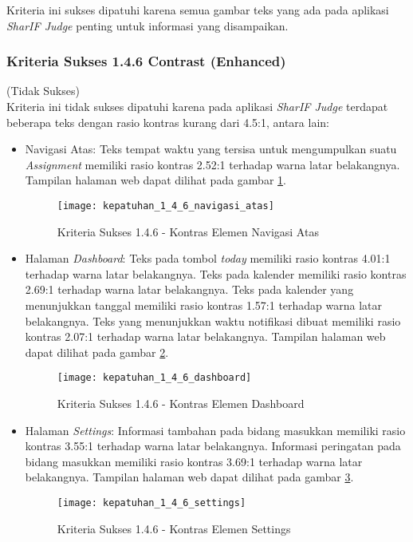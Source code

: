 Kriteria ini sukses dipatuhi karena semua gambar teks yang ada pada aplikasi \textit{SharIF Judge} penting untuk informasi yang disampaikan.

\subsubsection{Kriteria Sukses 1.4.6 Contrast (Enhanced)}
\label{subsubsec:kepatuhan_kriteria_1.4.6}

(Tidak Sukses) \\

Kriteria ini tidak sukses dipatuhi karena pada aplikasi \textit{SharIF Judge} terdapat beberapa teks dengan rasio kontras kurang dari 4.5:1, antara lain:
\begin{itemize}
	\item Navigasi Atas: Teks tempat waktu yang tersisa untuk mengumpulkan suatu \textit{Assignment} memiliki rasio kontras 2.52:1 terhadap warna latar belakangnya. Tampilan halaman web dapat dilihat pada gambar \ref{fig:kepatuhan_1_4_6_navigasi_atas}.
	\begin{figure}[H]
		\centering  
		\texttt{[image: kepatuhan\_1\_4\_6\_navigasi\_atas]}  
		\caption[Kriteria Sukses 1.4.6 - Kontras Elemen Navigasi Atas]{Kriteria Sukses 1.4.6 - Kontras Elemen Navigasi Atas} 
		\label{fig:kepatuhan_1_4_6_navigasi_atas} 
	\end{figure}

	\item Halaman \textit{Dashboard}: Teks pada tombol \textit{today} memiliki rasio kontras 4.01:1 terhadap warna latar belakangnya. Teks pada kalender memiliki rasio kontras 2.69:1 terhadap warna latar belakangnya. Teks pada kalender yang menunjukkan tanggal memiliki rasio kontras 1.57:1 terhadap warna latar belakangnya. Teks yang menunjukkan waktu notifikasi dibuat memiliki rasio kontras 2.07:1 terhadap warna latar belakangnya. Tampilan halaman web dapat dilihat pada gambar \ref{fig:kepatuhan_1_4_6_dashboard}.
	\begin{figure}[H]
		\centering  
		\texttt{[image: kepatuhan\_1\_4\_6\_dashboard]}  
		\caption[Kriteria Sukses 1.4.6 - Kontras Elemen Dashboard]{Kriteria Sukses 1.4.6 - Kontras Elemen Dashboard} 
		\label{fig:kepatuhan_1_4_6_dashboard} 
	\end{figure}

	\item Halaman \textit{Settings}: Informasi tambahan pada bidang masukkan memiliki rasio kontras 3.55:1 terhadap warna latar belakangnya. Informasi peringatan pada bidang masukkan memiliki rasio kontras 3.69:1 terhadap warna latar belakangnya. Tampilan halaman web dapat dilihat pada gambar \ref{fig:kepatuhan_1_4_6_settings}.
	\begin{figure}[H]
		\centering  
		\texttt{[image: kepatuhan\_1\_4\_6\_settings]}  
		\caption[Kriteria Sukses 1.4.6 - Kontras Elemen Settings]{Kriteria Sukses 1.4.6 - Kontras Elemen Settings} 
		\label{fig:kepatuhan_1_4_6_settings} 
	\end{figure}


\end{itemize}
